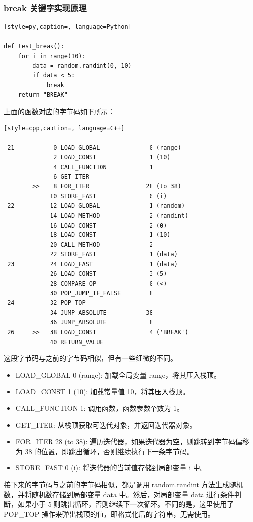 \subsubsection{break 关键字实现原理}
\begin{lstlisting}[style=py,caption=, language=Python]

def test_break():
    for i in range(10):
        data = random.randint(0, 10)
        if data < 5:
            break
    return "BREAK"
\end{lstlisting}
上面的函数对应的字节码如下所示：
\begin{lstlisting}[style=cpp,caption=, language=C++]

 21           0 LOAD_GLOBAL              0 (range)
              2 LOAD_CONST               1 (10)
              4 CALL_FUNCTION            1
              6 GET_ITER
        >>    8 FOR_ITER                28 (to 38)
             10 STORE_FAST               0 (i)
 22          12 LOAD_GLOBAL              1 (random)
             14 LOAD_METHOD              2 (randint)
             16 LOAD_CONST               2 (0)
             18 LOAD_CONST               1 (10)
             20 CALL_METHOD              2
             22 STORE_FAST               1 (data)
 23          24 LOAD_FAST                1 (data)
             26 LOAD_CONST               3 (5)
             28 COMPARE_OP               0 (<)
             30 POP_JUMP_IF_FALSE        8
 24          32 POP_TOP
             34 JUMP_ABSOLUTE           38
             36 JUMP_ABSOLUTE            8
 26     >>   38 LOAD_CONST               4 ('BREAK')
             40 RETURN_VALUE
\end{lstlisting}
这段字节码与之前的字节码相似，但有一些细微的不同。
\begin{itemize}
\item LOAD\_GLOBAL 0 (range): 加载全局变量 range，将其压入栈顶。 
\item LOAD\_CONST 1 (10): 加载常量值 10，将其压入栈顶。 
\item CALL\_FUNCTION 1: 调用函数，函数参数个数为 1。 
\item GET\_ITER: 从栈顶获取可迭代对象，并返回迭代器对象。 
\item FOR\_ITER 28 (to 38): 遍历迭代器，如果迭代器为空，则跳转到字节码偏移为 38 的位置，即跳出循环，否则继续执行下一条字节码。 
\item STORE\_FAST 0 (i): 将迭代器的当前值存储到局部变量 i 中。 
\end{itemize}
接下来的字节码与之前的字节码相似，都是调用 random.randint 方法生成随机数，并将随机数存储到局部变量 data 中。然后，对局部变量 data 进行条件判断，如果小于 5 则跳出循环，否则继续下一次循环。不同的是，这里使用了 POP\_TOP 操作来弹出栈顶的值，即格式化后的字符串，无需使用。
